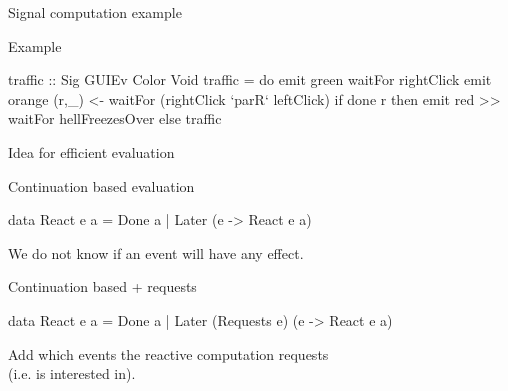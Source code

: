 \documentclass{beamer}
\begin{document}
\begin{frame}{Signal computation example}

\begin{block}{Example}
\vspace{-0.4cm}
\begin{center}
\end{center}
\vspace{-0.6cm}
\begin{code}
traffic :: Sig GUIEv Color Void
traffic = 
  do  emit green 
      waitFor rightClick
      emit orange
      (r,_) <- waitFor (rightClick `parR` leftClick)
      if done r 
      then  emit red >> waitFor hellFreezesOver 
      else  traffic
\end{code}
\setlength{\mathindent}{\tmathindenta}
\vspace{-0.8cm}
\end{block}
\end{frame}

\begin{frame}{Idea for efficient evaluation}

\begin{block}{Continuation based evaluation}

\begin{code}
data React e a = Done a | Later (e -> React e a) 
\end{code}
We do not know if an event will have any effect.
\end{block}

\begin{block}{Continuation based + requests}
\begin{code}
data React e a = Done a | Later (Requests e) (e -> React e a) 
\end{code}
Add which events the reactive computation \alert{requests}\\ (i.e. is interested in).
\end{block}
\end{frame}
\end{document}
